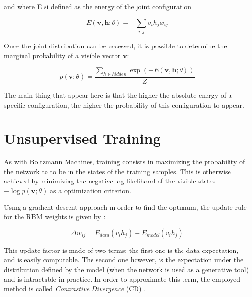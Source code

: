 \documentclass{report}
\begin{document}
	and where E si defined as the energy of the joint configuration
	
	\vspace{0.5cm}
	\begin{equation}
	E(\textbf{v}, \textbf{h}; \theta) = - \sum_{i,j}v_ih_jw_{ij}
	\end{equation}
	\vspace{0.5cm}
	
	Once the joint distribution can be accessed, it is possible to determine the
	marginal probability of a visible vector $\textbf{v}$:
	
	\vspace{0.5cm}
	\begin{equation}
	p (\textbf{v}; \theta ) =\frac{\sum_{h \in hidden} \exp (-E (\textbf{v}, \textbf{h}; \theta))}{Z}
	\end{equation}
	\vspace{0.5cm}
	
	The main thing that appear here is that the higher the absolute energy of a specific configuration, the higher the probability of this configuration to appear.
	
	\section{Unsupervised Training}
	
	As with Boltzmann Machines, training consists in maximizing the probability of 
	the network to to be in the states of the training samples. This is otherwise 
	achieved by minimizing the negative log-likelihood of the visible states 
	$-\log p (\textbf{v}; \theta)$ as a optimization criterion. 
	
	Using a gradient descent approach in order to find the optimum, the update 
	rule for the RBM weights is given by \cite{nagatani2014restricted}:
	
	\vspace{0.5cm}
	\begin{equation} \label{gradient_update}
	\Delta w_{ij} = E_{data}(v_i h_j) - E_{model}(v_i h_j) 
	\end{equation}
	\vspace{0.5cm}
	
	This update factor is made of two terms: the first one is the data expectation, 
	and is easily computable. The second one however, is the expectation under the 
	distribution defined by the model (when the network is used as a generative 
	tool) and is intractable in practice. In order to approximate this term, the 
	employed method is called \textit{Contrastive Divergence} 
	(CD) \cite{hinton2006fast}.
	
\end{document}
